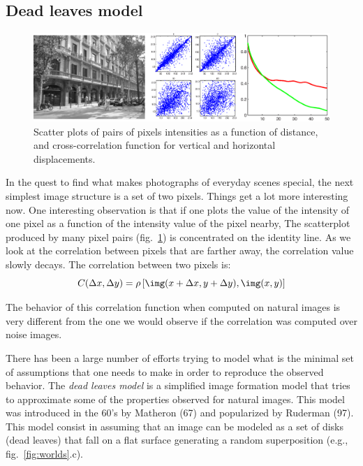 \subsection{Dead leaves model}

\begin{figure}[htpb]
  \centerline{
    \includegraphics[width=1\linewidth]{figures/statistical_image_models/correlation.eps}
  }
  \caption{Scatter plots of pairs of pixels intensities as a function of distance, and cross-correlation function for vertical and horizontal displacements.}
  \label{fig:correlation}
\end{figure}

In the quest to find what makes photographs of everyday scenes special, the next simplest image structure is a set of two pixels. Things get a lot more interesting now. One interesting observation is that if one plots the value of the intensity of one pixel as a function of the intensity value of the pixel nearby, The scatterplot produced by many pixel pairs (fig.~\ref{fig:correlation}) is concentrated on the identity line. As we look at the correlation between pixels that are farther away, the correlation value slowly decays. The correlation between two pixels is:
\begin{equation}
  C(\Delta x, \Delta y) = \rho \left[ \img(x+\Delta x,y+ \Delta y), \img(x, y) \right]
\end{equation}

The behavior of this correlation function when computed on natural images is very different from the one we would observe if the correlation was computed over noise images.

There has been a large number of efforts trying to model what is the minimal set of assumptions that one needs to make in order to reproduce the observed behavior. The {\em dead leaves model } is a simplified image formation model that tries to approximate some of the properties observed for natural images. This model was introduced in the 60's by Matheron (67) and popularized by Ruderman (97). This model consist in assuming that an image can be modeled as a set of disks (dead leaves) that fall on a flat surface generating a random superposition (e.g., fig.~\ref{fig:worlds}.c).


